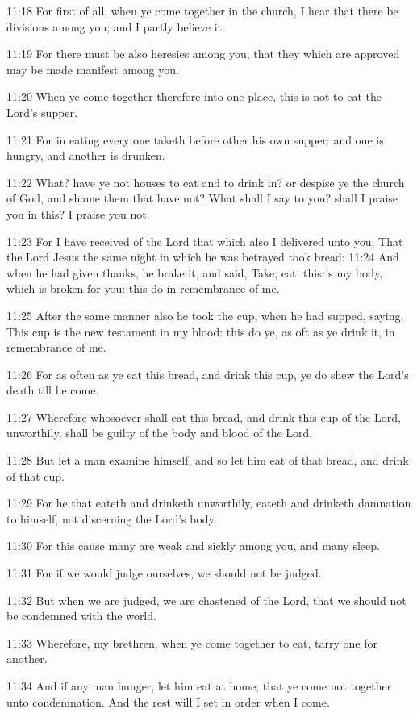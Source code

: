 11:18 For first of all, when ye come together in the church, I hear
that there be divisions among you; and I partly believe it.

11:19 For there must be also heresies among you, that they which are
approved may be made manifest among you.

11:20 When ye come together therefore into one place, this is not to
eat the Lord's supper.

11:21 For in eating every one taketh before other his own supper: and
one is hungry, and another is drunken.

11:22 What? have ye not houses to eat and to drink in? or despise ye
the church of God, and shame them that have not? What shall I say to
you? shall I praise you in this? I praise you not.

11:23 For I have received of the Lord that which also I delivered unto
you, That the Lord Jesus the same night in which he was betrayed took
bread: 11:24 And when he had given thanks, he brake it, and said,
Take, eat: this is my body, which is broken for you: this do in
remembrance of me.

11:25 After the same manner also he took the cup, when he had supped,
saying, This cup is the new testament in my blood: this do ye, as oft
as ye drink it, in remembrance of me.

11:26 For as often as ye eat this bread, and drink this cup, ye do
shew the Lord's death till he come.

11:27 Wherefore whosoever shall eat this bread, and drink this cup of
the Lord, unworthily, shall be guilty of the body and blood of the
Lord.

11:28 But let a man examine himself, and so let him eat of that bread,
and drink of that cup.

11:29 For he that eateth and drinketh unworthily, eateth and drinketh
damnation to himself, not discerning the Lord's body.

11:30 For this cause many are weak and sickly among you, and many
sleep.

11:31 For if we would judge ourselves, we should not be judged.

11:32 But when we are judged, we are chastened of the Lord, that we
should not be condemned with the world.

11:33 Wherefore, my brethren, when ye come together to eat, tarry one
for another.

11:34 And if any man hunger, let him eat at home; that ye come not
together unto condemnation. And the rest will I set in order when I
come.

